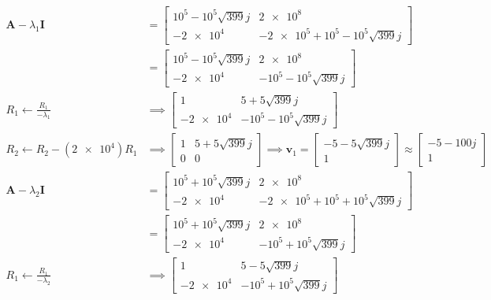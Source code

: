 \documentclass{article}
\begin{document}
\begin{align}
    \bm{A} - \lambda_1 \bm{I} &=
    \begin{bmatrix}
        10^5 - 10^5 \sqrt{399} j & \num{2e8} \\
        \num{-2e4} & \num{-2e5} + 10^5 - 10^5 \sqrt{399} j
    \end{bmatrix} \\
    &= \begin{bmatrix}
        10^5 - 10^5 \sqrt{399} j & \num{2e8} \\
        \num{-2e4} & -10^5 - 10^5 \sqrt{399} j
    \end{bmatrix} \\
    R_1 \leftarrow \frac{R_1}{-\lambda_1} &\implies \begin{bmatrix}
        1 & 5 + 5 \sqrt{399} j \\
        \num{-2e4} & -10^5 - 10^5 \sqrt{399} j
    \end{bmatrix} \\
    R_2 \leftarrow R_2 - (\num{2e4}) R_1 &\implies \begin{bmatrix}
        1 & 5 + 5 \sqrt{399} j \\
        0 & 0
    \end{bmatrix} \implies \bm{v}_1 =
    \begin{bmatrix}
        -5 - 5 \sqrt{399} j \\
        1
    \end{bmatrix} \approx
    \begin{bmatrix}
        -5 - 100j \\
        1
    \end{bmatrix} \\
    \bm{A} - \lambda_2 \bm{I} &=
    \begin{bmatrix}
        10^5 + 10^5 \sqrt{399} j & \num{2e8} \\
        \num{-2e4} & \num{-2e5} + 10^5 + 10^5 \sqrt{399} j
    \end{bmatrix} \\
    &= \begin{bmatrix}
        10^5 + 10^5 \sqrt{399} j & \num{2e8} \\
        \num{-2e4} & -10^5 + 10^5 \sqrt{399} j
    \end{bmatrix} \\
    R_1 \leftarrow \frac{R_1}{-\lambda_2} &\implies \begin{bmatrix}
        1 & 5 - 5 \sqrt{399} j \\
        \num{-2e4} & -10^5 + 10^5 \sqrt{399} j

\end{bmatrix}
\end{align}
\end{document}
